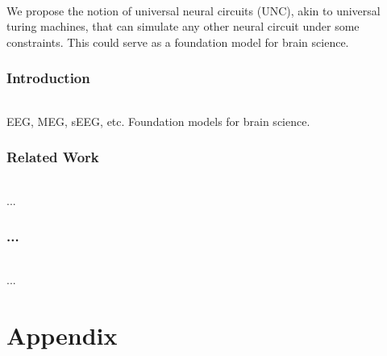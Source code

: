 \documentclass{article}
\begin{document}
\paragraph{}We propose the notion of universal neural circuits (UNC), akin to universal turing machines, that can simulate any other neural circuit under some constraints. This could serve as a foundation model for brain science.

\section{Introduction}

\paragraph{}EEG, MEG, sEEG, etc. Foundation models for brain science.

\section{Related Work}

\paragraph{}...

\section{...}

\paragraph{}...

\part{Appendix} %
\parttoc %
\end{document}
